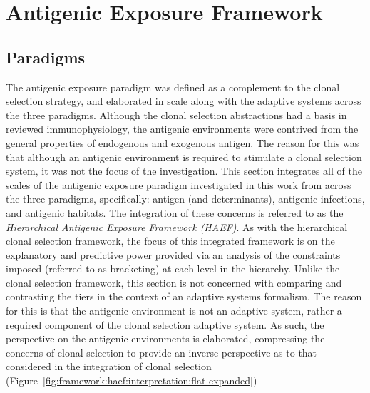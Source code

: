 \section{Antigenic Exposure Framework}
\label{sec:framework:haef}

%
%
\subsection{Paradigms}
\label{sec:framework:haef:paradigms}
The antigenic exposure paradigm was defined as a complement to the clonal selection strategy, and elaborated in scale along with the adaptive systems across the three paradigms. Although the clonal selection abstractions had a basis in reviewed immunophysiology, the antigenic environments were contrived from the general properties of endogenous and exogenous antigen. The reason for this was that although an antigenic environment is required to stimulate a clonal selection system, it was not the focus of the investigation. 
This section integrates all of the scales of the antigenic exposure paradigm investigated in this work from across the three paradigms, specifically: antigen (and determinants), antigenic infections, and antigenic habitats. The integration of these concerns is referred to as the \emph{Hierarchical Antigenic Exposure Framework (HAEF)}.
As with the hierarchical clonal selection framework, the focus of this integrated framework is on the explanatory and predictive power provided via an analysis of the constraints imposed (referred to as bracketing) at each level in the hierarchy. Unlike the clonal selection framework, this section is not concerned with comparing and contrasting the tiers in the context of an adaptive systems formalism. The reason for this is that the antigenic environment is not an adaptive system, rather a required component of the clonal selection adaptive system.
As such, the perspective on the antigenic environments is elaborated, compressing the concerns of clonal selection to provide an inverse perspective as to that considered in the integration of clonal selection (Figure~\ref{fig:framework:haef:interpretation:flat-expanded})

